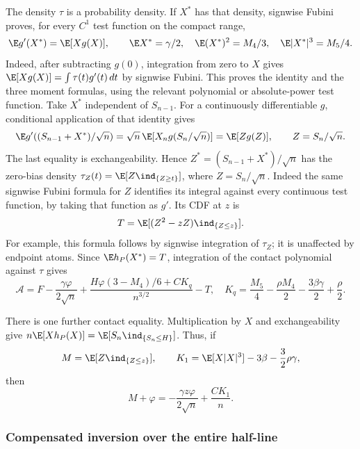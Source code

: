 The density $\tau$ is a probability density. If $X^*$ has that density,
signwise Fubini proves, for every $C^1$ test function on the compact range,
\[
 \E g'(X^*)=\E[Xg(X)],\qquad
 \E X^*=\gamma/2,\quad \E(X^*)^2=M_4/3,
 \quad\E|X^*|^3=M_5/4.
\]
Indeed, after subtracting $g(0)$, integration from zero to $X$ gives
$\E[Xg(X)]=\int\tau(t)g'(t)\,dt$ by signwise Fubini. This proves the
identity and the three moment formulas, using the relevant polynomial
or absolute-power test function.
Take $X^*$ independent of $S_{n-1}$. For a continuously differentiable
$g$, conditional application of that identity gives
\[
 \E g'((S_{n-1}+X^*)/\sqrt n)
 =\sqrt n\,\E[X_n g(S_n/\sqrt n)]
 =\E[Zg(Z)],\qquad Z=S_n/\sqrt n.
\]
The last equality is exchangeability. Hence
$Z^*=(S_{n-1}+X^*)/\sqrt n$ has the zero-bias density
$\tau_Z(t)=\E[Z\ind_{\{Z\ge t\}}]$, where $Z=S_n/\sqrt n$.
Indeed the same signwise Fubini formula for $Z$ identifies its integral
against every continuous test function, by taking that function as $g'$.
Its CDF at $z$ is
\[
 T=\E[(Z^2-zZ)\ind_{\{Z\le z\}}].
\]
For example, this formula follows by signwise integration of $\tau_Z$;
it is unaffected by endpoint atoms. Since $\E h_P(X^*)=T$, integration
of the contact polynomial against $\tau$ gives
\begin{equation}\label{ms:fourier:afcore:eq:second-slack}
 \mathcal A=F-\frac{\gamma\varphi}{2\sqrt n}
 +\frac{H\varphi(3-M_4)/6+CK_q}{n^{3/2}}-T,
 \quad K_q=\frac{M_5}{4}-\frac{\rho M_4}{2}
                  -\frac{3\beta\gamma}{2}+\frac\rho2.
\end{equation}

There is one further contact equality. Multiplication by $X$ and
exchangeability give $n\E[Xh_P(X)]=\E[S_n\ind_{\{S_n\le H\}}]$.
Thus, if
\[
 M=\E[Z\ind_{\{Z\le z\}}],\qquad
 K_1=\E[X|X|^3]-3\beta-\frac32\rho\gamma,
\]
then
\begin{equation}\label{ms:fourier:afcore:eq:truncated-first}
 M+\varphi=-\frac{\gamma z\varphi}{2\sqrt n}+\frac{CK_1}{n}.
\end{equation}

\subsubsection{Compensated inversion over the entire half-line}

